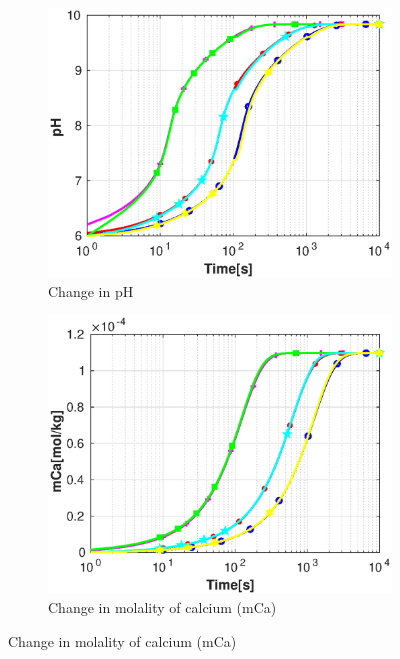 \begin{figure}[!h]
        \centering
    \begin{subfigure}{.5\linewidth}
            \centering
        \includegraphics[width=\textwidth]{PICTURES/dvm_pH6_pH.eps}
        \caption{Change in pH}
        \label{fig:dvmpH6pH}
    \end{subfigure}%
        \hfill
    \begin{subfigure}{.5\linewidth}
            \centering
        \includegraphics[width=\textwidth]{PICTURES/dvm_pH6_mCa.eps}
        \caption{Change in molality of calcium (mCa)}
        \label{fig:dvmpH6mCa}
    \end{subfigure}%

\end{figure}
